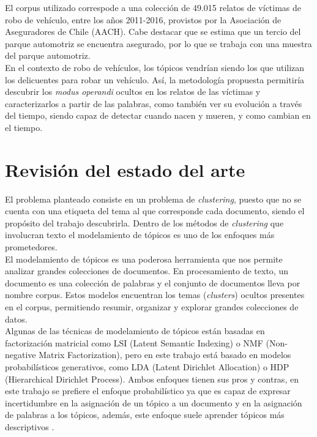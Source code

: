 \documentclass[letterpaper,12pt,oneside]{book} %
\begin{document}
El corpus utilizado correspode a una colección de 49.015 relatos de víctimas de robo de vehículo, entre los años 2011-2016, provistos por la Asociación de Aseguradores de Chile (AACH). Cabe destacar que se estima que un tercio del parque automotriz se encuentra asegurado, por lo que se trabaja con una muestra del parque automotriz.\\

En el contexto de robo de vehículos, los tópicos vendrían siendo los  que utilizan los delicuentes para robar un vehículo. Así, la metodología propuesta permitiría descubrir los \textit{modus operandi} ocultos en los relatos de las víctimas y caracterizarlos a partir de las palabras, como también ver su evolución a través del tiempo, siendo capaz de detectar cuando nacen y mueren, y como cambian en el tiempo.\\

\section{Revisión del estado del arte}

El problema planteado consiste en un problema de \textit{clustering}, puesto que no se cuenta con una etiqueta del tema al que corresponde cada documento, siendo el propósito del trabajo descubrirla. Dentro de los métodos de \textit{clustering} que involucran texto el modelamiento de tópicos es uno de los enfoques más prometedores.\\

El modelamiento de tópicos es una poderosa herramienta que nos permite analizar grandes colecciones de documentos. En procesamiento de texto, un documento es una colección de palabras y el conjunto de documentos lleva por nombre corpus. Estos modelos encuentran los temas (\textit{clusters}) ocultos presentes en el corpus, permitiendo resumir, organizar y explorar grandes colecciones de datos.\\

Algunas de las técnicas de modelamiento de tópicos están basadas en factorización matricial como LSI (Latent Semantic Indexing) \citep{dumais2004latent} o NMF (Non-negative Matrix Factorization)\citep{xu2003document}, pero en este trabajo está basado en modelos probabilísticos generativos, como LDA (Latent Dirichlet Allocation)\citep{blei2003latent} o HDP (Hierarchical Dirichlet Process)\citep{teh2005sharing}. Ambos enfoques tienen sus pros y contras, en este trabajo se prefiere el enfoque probabilístico ya que es capaz de expresar incertidumbre en la asignación de un tópico a un documento y en la asignación de palabras a los tópicos, además, este enfoque suele aprender tópicos más descriptivos \citep{stevens2012exploring}.\\
\end{document}
